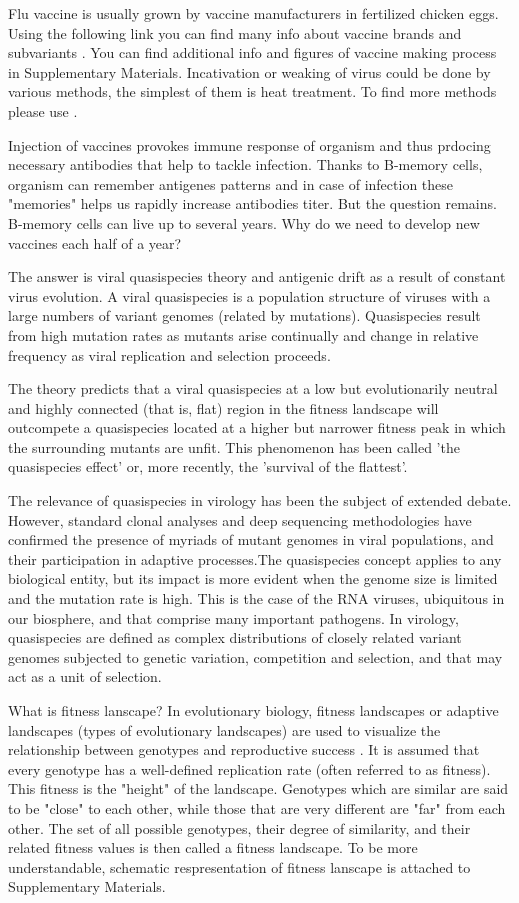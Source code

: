 \documentclass{article}
\begin{document}
Flu vaccine is usually grown by vaccine manufacturers in fertilized chicken eggs. Using the following link you can find many info about vaccine brands and subvariants  \cite{wikisi}. You can find additional info and figures of vaccine making process in Supplementary Materials. Incativation or weaking of virus could be done by various methods, the simplest of them is heat treatment. To find more methods please use  \cite{wikivi}.

Injection of vaccines provokes immune response of organism and thus prdocing necessary antibodies that help to tackle infection. Thanks to B-memory cells, organism can remember antigenes patterns and in case of infection these "memories" helps us rapidly increase antibodies titer.
But the question remains. B-memory cells can live up to several years. Why do we need to develop new vaccines each half of a year?

The answer is viral quasispecies theory and antigenic drift as a result of constant virus evolution.
A viral quasispecies is a population structure of viruses with a large numbers of variant genomes (related by mutations). Quasispecies result from high mutation rates as mutants arise continually and change in relative frequency as viral replication and selection proceeds.

The theory predicts that a viral quasispecies at a low but evolutionarily neutral and highly connected (that is, flat) region in the fitness landscape will outcompete a quasispecies located at a higher but narrower fitness peak in which the surrounding mutants are unfit. This phenomenon has been called 'the quasispecies effect' or, more recently, the 'survival of the flattest'.

The relevance of quasispecies in virology has been the subject of extended debate. However, standard clonal analyses and deep sequencing methodologies have confirmed the presence of myriads of mutant genomes in viral populations, and their participation in adaptive processes.The quasispecies concept applies to any biological entity, but its impact is more evident when the genome size is limited and the mutation rate is high. This is the case of the RNA viruses, ubiquitous in our biosphere, and that comprise many important pathogens. In virology, quasispecies are defined as complex distributions of closely related variant genomes subjected to genetic variation, competition and selection, and that may act as a unit of selection. 

What is fitness lanscape? In evolutionary biology, fitness landscapes or adaptive landscapes (types of evolutionary landscapes) are used to visualize the relationship between genotypes and reproductive success \cite{wikifl}. It is assumed that every genotype has a well-defined replication rate (often referred to as fitness). This fitness is the "height" of the landscape. Genotypes which are similar are said to be "close" to each other, while those that are very different are "far" from each other. The set of all possible genotypes, their degree of similarity, and their related fitness values is then called a fitness landscape. To be more understandable, schematic respresentation of fitness lanscape is attached to Supplementary Materials.
\end{document}
